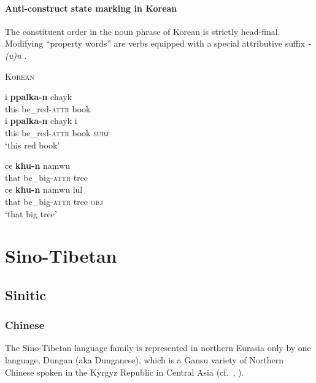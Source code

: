 \paragraph{Anti-construct state marking in Korean}
The constituent order in the noun phrase of Korean is strictly head-final. Modifying “property words” are verbs equipped with a special attributive suffix \textit{-(u)n} \citep{martin-etal1969}.
\begin{exe}
\ex \textsc{Korean} \citep[61]{chang1996}
\begin{xlist}
\ex
\begin{xlist}
\ex
\gll	i \textbf{ppalka-n} chayk\\
	this be\_red-\textsc{attr} book\\
\ex	
\gll	i \textbf{ppalka-n} chayk i\\
	this be\_red-\textsc{attr} book \textsc{subj}\\
\glt	‘this red book’
\end{xlist}
\ex
\begin{xlist}
\ex	
\gll	ce \textbf{khu-n} namwu\\
	that be\_big-\textsc{attr} tree\\
\ex
\gll	ce \textbf{khu-n} namwu lul\\
	that be\_big-\textsc{attr} tree \textsc{obj}\\
\glt	‘that big tree’
\end{xlist}
\end{xlist}
\end{exe}

\section{Sino-Tibetan}\label{sinotibetan synchr}
\subsection{Sinitic}
\subsubsection{Chinese}
The Sino-Tibetan language family is represented in northern Eurasia only by one language, Dungan (aka Dunganese), which is a Gansu variety of Northern Chinese spoken in the Kyrgyz Republic in Central Asia (cf.~\citealt[85]{yuo2003}, \citealt{kalimov1968}).\\

